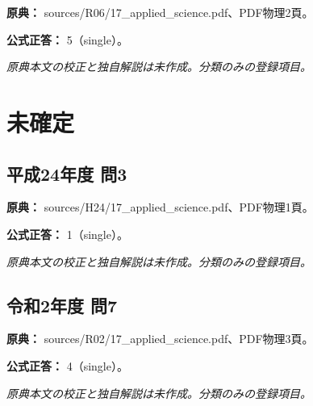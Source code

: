 \noindent\textbf{原典：} sources/R06/17\_applied\_science.pdf、PDF物理2頁。

\textbf{公式正答：} 5（single）。

\par\textit{原典本文の校正と独自解説は未作成。分類のみの登録項目。}

\section{未確定}

\subsection{平成24年度 問3}
\label{q:h24-reg-applied-03}

\noindent\textbf{原典：} sources/H24/17\_applied\_science.pdf、PDF物理1頁。

\textbf{公式正答：} 1（single）。

\par\textit{原典本文の校正と独自解説は未作成。分類のみの登録項目。}

\subsection{令和2年度 問7}
\label{q:r02-reg-applied-07}

\noindent\textbf{原典：} sources/R02/17\_applied\_science.pdf、PDF物理3頁。

\textbf{公式正答：} 4（single）。

\par\textit{原典本文の校正と独自解説は未作成。分類のみの登録項目。}

